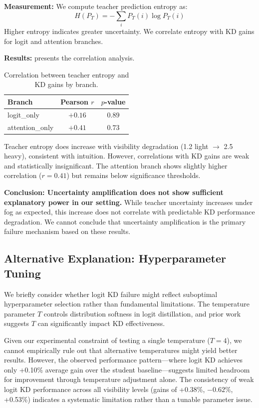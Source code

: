 \textbf{Measurement:} We compute teacher prediction entropy as:
\begin{equation}
H(P_T) = -\sum_i P_T(i) \log P_T(i)
\end{equation}
Higher entropy indicates greater uncertainty. We correlate entropy with KD gains for logit and attention branches.

\textbf{Results:}  presents the correlation analysis.

\begin{table}[htbp]
\centering
\caption{Correlation between teacher entropy and KD gains by branch.}
\label{tab:entropy_corr}
\begin{tabular}{@{}lcc@{}}
\toprule
Branch & Pearson $r$ & $p$-value \\
\midrule
logit\_only & $+0.16$ & $0.89$ \\
attention\_only & $+0.41$ & $0.73$ \\
\bottomrule
\end{tabular}
\end{table}

Teacher entropy does increase with visibility degradation (1.2 light $\to$ 2.5 heavy), consistent with intuition. However, correlations with KD gains are weak and statistically insignificant. The attention branch shows slightly higher correlation ($r=0.41$) but remains below significance thresholds.

\textbf{Conclusion: Uncertainty amplification does not show sufficient explanatory power in our setting.} While teacher uncertainty increases under fog as expected, this increase does not correlate with predictable KD performance degradation. We cannot conclude that uncertainty amplification is the primary failure mechanism based on these results.

\subsection{Alternative Explanation: Hyperparameter Tuning}

We briefly consider whether logit KD failure might reflect suboptimal hyperparameter selection rather than fundamental limitations. The temperature parameter $T$ controls distribution softness in logit distillation, and prior work suggests $T$ can significantly impact KD effectiveness.

Given our experimental constraint of testing a single temperature ($T=4$), we cannot empirically rule out that alternative temperatures might yield better results. However, the observed performance pattern---where logit KD achieves only +0.10\% average gain over the student baseline---suggests limited headroom for improvement through temperature adjustment alone. The consistency of weak logit KD performance across all visibility levels (gains of +0.38\%, $-0.62\%$, +0.53\%) indicates a systematic limitation rather than a tunable parameter issue.

